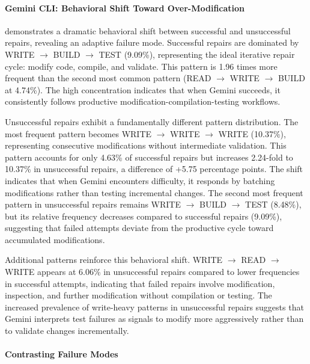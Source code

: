 \paragraph{Gemini CLI: Behavioral Shift Toward Over-Modification}

\geminicli demonstrates a dramatic behavioral shift between successful and unsuccessful repairs, revealing an adaptive failure mode. Successful repairs are dominated by WRITE $\rightarrow$ BUILD $\rightarrow$ TEST (9.09\%), representing the ideal iterative repair cycle: modify code, compile, and validate. This pattern is 1.96 times more frequent than the second most common pattern (READ $\rightarrow$ WRITE $\rightarrow$ BUILD at 4.74\%). The high concentration indicates that when Gemini succeeds, it consistently follows productive modification-compilation-testing workflows.

Unsuccessful repairs exhibit a fundamentally different pattern distribution. The most frequent pattern becomes WRITE $\rightarrow$ WRITE $\rightarrow$ WRITE (10.37\%), representing consecutive modifications without intermediate validation. This pattern accounts for only 4.63\% of successful repairs but increases 2.24-fold to 10.37\% in unsuccessful repairs, a difference of +5.75 percentage points. The shift indicates that when Gemini encounters difficulty, it responds by batching modifications rather than testing incremental changes. The second most frequent pattern in unsuccessful repairs remains WRITE $\rightarrow$ BUILD $\rightarrow$ TEST (8.48\%), but its relative frequency decreases compared to successful repairs (9.09\%), suggesting that failed attempts deviate from the productive cycle toward accumulated modifications.

Additional patterns reinforce this behavioral shift. WRITE $\rightarrow$ READ $\rightarrow$ WRITE appears at 6.06\% in unsuccessful repairs compared to lower frequencies in successful attempts, indicating that failed repairs involve modification, inspection, and further modification without compilation or testing. The increased prevalence of write-heavy patterns in unsuccessful repairs suggests that Gemini interprets test failures as signals to modify more aggressively rather than to validate changes incrementally.

\paragraph{Contrasting Failure Modes}

